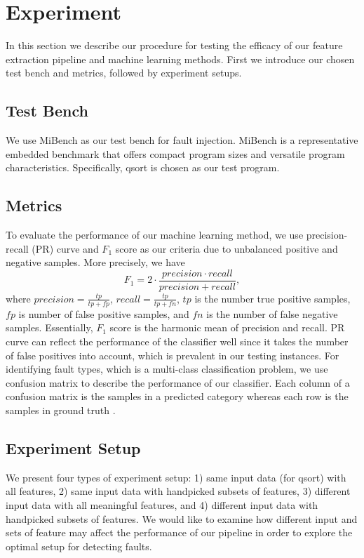 \section{Experiment}
In this section we describe our procedure for testing the efficacy of our feature extraction pipeline and machine learning methods. First we introduce our chosen test bench and metrics, followed by experiment setups.

\subsection{Test Bench}
We use MiBench \cite{guthaus2001mibench} as our test bench for fault injection. MiBench is a representative embedded benchmark that offers compact program sizes and versatile program characteristics. Specifically, qsort is chosen as our test program.

\subsection{Metrics}
To evaluate the performance of our machine learning method, we use precision-recall (PR) curve and $F_1$ score as our criteria due to unbalanced positive and negative samples. More precisely, we have
\begin{equation}
F_{1} = 2\cdot\frac{precision \cdot recall}{precision + recall},
\end{equation}
where $precision = \frac{tp}{tp+fp}$, $recall = \frac{tp}{tp+fn}$, $tp$ is the number true positive samples, $fp$ is number of false positive samples, and $fn$ is the number of false negative samples. Essentially, $F_1$ score is the harmonic mean of precision and recall. PR curve can reflect the performance of the classifier well since it takes the number of false positives into account, which is prevalent in our testing instances. For identifying fault types, which is a multi-class classification problem, we use confusion matrix to describe the performance of our classifier. Each column of a confusion matrix is the samples in a predicted category whereas each row is the samples in ground truth \cite{powers2011evaluation}.

\subsection{Experiment Setup}
We present four types of experiment setup: 1) same input data (for qsort) with all features, 2) same input data with handpicked subsets of features, 3) different input data with all meaningful features, and 4) different input data with handpicked subsets of features. We would like to examine how different input and sets of feature  may affect the performance of our pipeline in order to explore the optimal setup for detecting faults.

